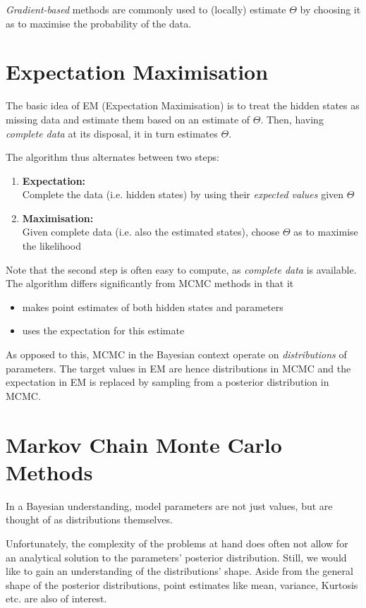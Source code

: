 \textit{Gradient-based} methods are commonly used to (locally) estimate $\Theta$ by choosing it as to maximise the probability of the data. 


\section{Expectation Maximisation}
 
The basic idea of EM (Expectation Maximisation) is to treat the hidden states as missing data and estimate them based on an estimate of $\Theta$. Then, having \textit{complete data} at its disposal, it in turn estimates $\Theta$. 

The algorithm thus alternates between two steps: 
\begin{enumerate}
	\item \textbf{Expectation:} \\
		  Complete the data (i.e. hidden states) by using their \textit{expected values} given $\Theta$
	\item \textbf{Maximisation:} \\
		  Given complete data (i.e. also the estimated states), choose $\Theta$ as to maximise the likelihood 
\end{enumerate} 

Note that the second step is often easy to compute, as \textit{complete data} is available. The algorithm differs significantly from MCMC methods in that it 
\begin{itemize}
	\item makes point estimates of both hidden states and parameters
	\item uses the expectation for this estimate
\end{itemize}

As opposed to this, MCMC in the Bayesian context operate on \textit{distributions} of parameters. The target values in EM are hence distributions in MCMC and the expectation in EM is replaced by sampling from a posterior distribution in MCMC. 


\section{Markov Chain Monte Carlo Methods}

	In a Bayesian understanding, model parameters are not just values, but are thought of as distributions themselves.
	
	Unfortunately, the complexity of the problems at hand does often not allow for an analytical solution to the parameters' posterior distribution. 
	Still, we would like to gain an understanding of the distributions' shape. Aside from the general shape of the posterior distributions, point estimates like mean, variance, Kurtosis etc. are also of interest. 
	
